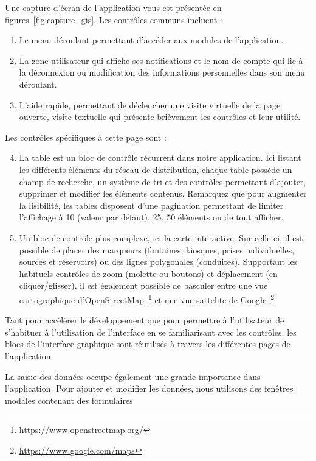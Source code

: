\documentclass{EPL-master-thesis-covers-FR}
\begin{document}
			Une capture d'écran de l'application vous est présentée en figures~\ref{fig:capture_gis}. Les contrôles communs incluent :
			\begin{enumerate}
				\item Le menu déroulant permettant d'accéder aux modules de l'application.
				\item La zone utilisateur qui affiche ses notifications et le nom de compte qui lie à la{} déconnexion ou modification des informations personnelles dans son menu déroulant.
				\item L'aide rapide, permettant de déclencher une visite virtuelle de la page ouverte, visite textuelle qui présente brièvement les contrôles et leur utilité.
			\end{enumerate}

			Les contrôles spécifiques à cette page sont :
			\begin{enumerate}\setcounter{enumi}{3} %
				\item La table est un bloc de contrôle récurrent dans notre application. Ici listant les différents éléments du réseau de distribution, chaque table possède un champ de recherche, un système de tri et des contrôles permettant d'ajouter, supprimer et modifier les éléments contenus. Remarquez que pour augmenter la lisibilité, les tables disposent d'une pagination permettant de limiter l'affichage à 10 (valeur par défaut), 25, 50 éléments ou de tout afficher.
				\item Un bloc de contrôle plus complexe, ici la carte interactive. Sur celle-ci, il est possible de placer des marqueurs (fontaines, kiosques, prises individuelles, sources et réservoirs) ou des lignes polygonales (conduites). Supportant les habituels contrôles de zoom (molette ou boutons) et déplacement (en cliquer/glisser), il est également possible de basculer entre une vue cartographique d'OpenStreetMap~\footnote{\url{https://www.openstreetmap.org/}} et une vue sattelite de Google~\footnote{\url{https://www.google.com/maps}}
			\end{enumerate}

			Tant pour accélérer le développement que pour permettre à l'utilisateur de s'habituer à l'utilisation de l'interface en se familiarisant avec les contrôles, les blocs de l'interface graphique sont réutilisés à travers les différentes pages de l'application.

			La saisie des données occupe également une grande importance dans l'application. Pour ajouter et modifier les données, nous utilisons des fenêtres modales contenant des formulaires
\end{document}
